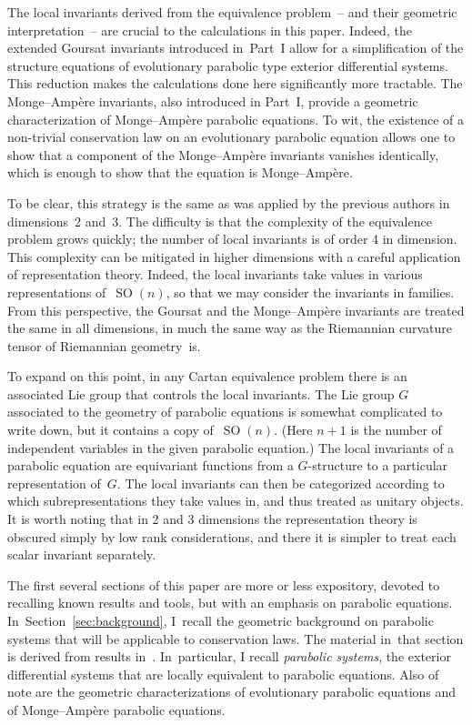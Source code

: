 \documentclass[pdftex]{sigma}
\DeclareMathOperator{\SO}{SO}
\numberwithin{equation}{section}
\begin{document}
The local invariants derived from the equivalence problem~-- and their geometric interpretation~-- are crucial to the calculations in this paper.
Indeed, the extended Goursat invariants introduced in~Part~I allow for a simplification of the structure equations of evolutionary parabolic type exterior differential systems.
This reduction makes the calculations done here significantly more tractable.
The Monge--Amp\`ere invariants, also introduced in Part~I, provide a geometric characterization of Monge--Amp\`ere parabolic equations.
To wit, the existence of a non-trivial conservation law on an evolutionary parabolic equation allows one to show that a component of the Monge--Amp\`ere invariants vanishes identically, which is enough to show that the equation is Monge--Amp\`ere.

To be clear, this strategy is the same as was applied by the previous authors in dimen\-si\-ons~2 and~3.
The difficulty is that the complexity of the equivalence problem grows quickly; the number of local invariants is of order 4 in dimension.
This complexity can be mitigated in higher dimensions with a careful application of representation theory.
Indeed, the local invariants take values in various representations of~$\SO(n)$, so that we may consider the invariants in families.
From this perspective, the Goursat and the Monge--Amp\`ere invariants are treated the same in all dimensions, in much the same way as the Riemannian curvature tensor of Riemannian geometry~is.

To expand on this point, in any Cartan equivalence problem there is an associated Lie group that controls the local invariants.
The Lie group $ G $ associated to the geometry of parabolic equations is somewhat complicated to write down, but it contains a copy of~$\SO(n)$.
(Here $n+1$ is the number of independent variables in the given parabolic equation.)
The local invariants of a parabolic equation are equivariant functions from a $ G $-structure to a particular representation of~$ G $.
The local invariants can then be categorized according to which subrepresentations they take values in, and thus treated as unitary objects.
It is worth noting that in 2 and 3 dimensions the representation theory is obscured simply by low rank considerations, and there it is simpler to treat each scalar invariant separately.

 The first several sections of this paper are more or less expository, devoted to recalling known results and tools, but with an emphasis on parabolic equations. In~Section~\ref{sec:background}, I~recall the geometric background on parabolic systems that will be applicable to conservation laws. The material in~that section is derived from results in~\cite{McMillan:ParabolicsI}. In~particular, I recall \emph{parabolic systems}, the exterior differential systems that are locally equivalent to parabolic equations.
Also of note are the geometric characterizations of evolutionary parabolic equations and of Monge--Amp\`ere parabolic equations.
\end{document}
